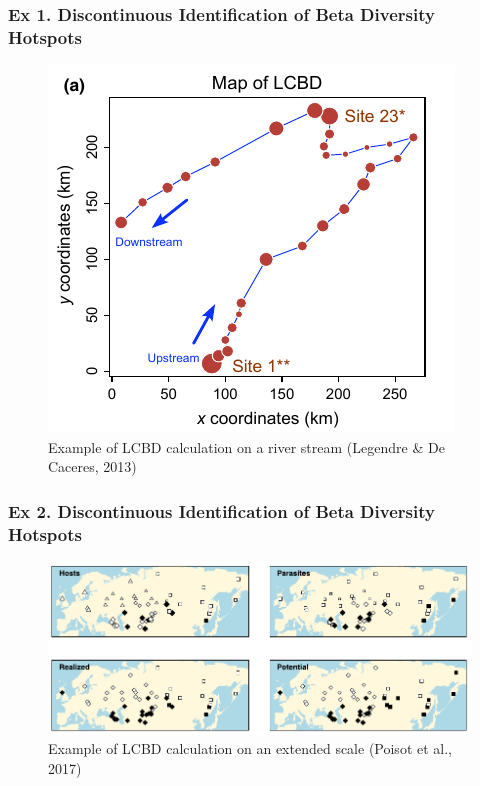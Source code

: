 \documentclass[10pt]{beamer}
\begin{document}
\begin{frame}
  \frametitle{Ex 1. Discontinuous Identification of Beta Diversity Hotspots}
  \begin{figure}
    \centering
    \hspace*{-0cm}\includegraphics[scale=0.5]{fig/lcbd_LegeDeCa2013.png}
    \caption{Example of LCBD calculation on a river stream (Legendre \& De Caceres, 2013)}
  \end{figure}
\end{frame}

\begin{frame}
  \frametitle{Ex 2. Discontinuous Identification of Beta Diversity Hotspots}
  \begin{figure}
    \centering
    \hspace*{-0cm}\includegraphics[scale=0.35]{fig/lcbd_Pois2017.png}
    \caption{Example of LCBD calculation on an extended scale (Poisot et al., 2017)}
  \end{figure}
\end{frame}
\end{document}
